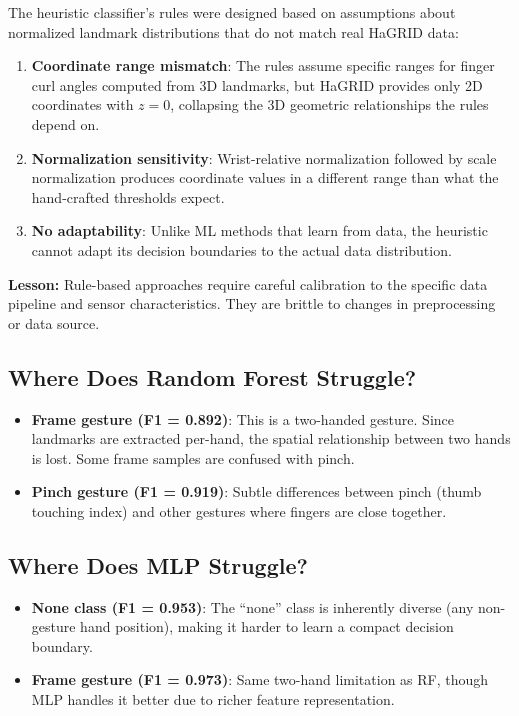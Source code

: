 \documentclass[11pt,a4paper]{article}
\begin{document}
The heuristic classifier's rules were designed based on assumptions about normalized landmark distributions that do not match real HaGRID data:

\begin{enumerate}
    \item \textbf{Coordinate range mismatch}: The rules assume specific ranges for finger curl angles computed from 3D landmarks, but HaGRID provides only 2D coordinates with $z = 0$, collapsing the 3D geometric relationships the rules depend on.
    \item \textbf{Normalization sensitivity}: Wrist-relative normalization followed by scale normalization produces coordinate values in a different range than what the hand-crafted thresholds expect.
    \item \textbf{No adaptability}: Unlike ML methods that learn from data, the heuristic cannot adapt its decision boundaries to the actual data distribution.
\end{enumerate}

\textbf{Lesson:} Rule-based approaches require careful calibration to the specific data pipeline and sensor characteristics. They are brittle to changes in preprocessing or data source.

\subsection{Where Does Random Forest Struggle?}

\begin{itemize}
    \item \textbf{Frame gesture (F1 = 0.892)}: This is a two-handed gesture. Since landmarks are extracted per-hand, the spatial relationship between two hands is lost. Some frame samples are confused with pinch.
    \item \textbf{Pinch gesture (F1 = 0.919)}: Subtle differences between pinch (thumb touching index) and other gestures where fingers are close together.
\end{itemize}

\subsection{Where Does MLP Struggle?}

\begin{itemize}
    \item \textbf{None class (F1 = 0.953)}: The ``none'' class is inherently diverse (any non-gesture hand position), making it harder to learn a compact decision boundary.
    \item \textbf{Frame gesture (F1 = 0.973)}: Same two-hand limitation as RF, though MLP handles it better due to richer feature representation.
\end{itemize}
\end{document}
